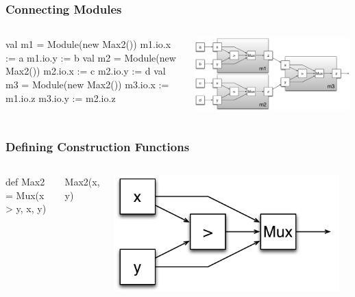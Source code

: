 \documentclass[xcolor=pdflatex,dvipsnames,table]{beamer}
\begin{document}
\begin{frame}[fragile]
\frametitle{Connecting Modules}

\begin{columns}
\begin{scala}
val m1 = Module(new Max2())
m1.io.x := a
m1.io.y := b
val m2 = Module(new Max2())
m2.io.x := c
m2.io.y := d
val m3 = Module(new Max2())
m3.io.x := m1.io.z
m3.io.y := m2.io.z
\end{scala}


\begin{center}
\includegraphics[width=0.99\textwidth]{figs/Max4.pdf} \\
\end{center}
\end{columns}

\end{frame}


\begin{frame}[fragile]
\frametitle{Defining Construction Functions}

\begin{columns}


\begin{scala}
def Max2 = Mux(x > y, x, y)
\end{scala}
\begin{scala}
Max2(x, y)
\end{scala}


\begin{center}
\includegraphics[width=0.95\textwidth]{figs/Max2.pdf} \\[1cm]
\end{center}

\end{columns}

\end{frame}
\end{document}
